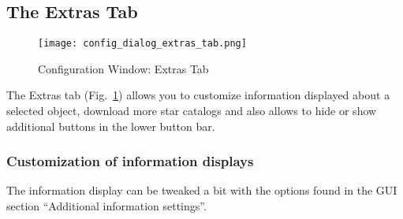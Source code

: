 \subsection{The Extras Tab}
\label{sec:gui:configuration:extras}

\begin{figure}[htbp]
\centering\texttt{[image: config\_dialog\_extras\_tab.png]}
\caption{Configuration Window: Extras Tab}
\label{fig:gui:configuration:extras}
\end{figure}

The Extras tab (Fig.~\ref{fig:gui:configuration:extras}) allows you to
customize information displayed about a selected object, download more
star catalogs and also allows to hide or show additional buttons in
the lower button bar. 
\subsubsection{Customization of information displays}
The information display can be tweaked a bit with the options found in the GUI section ``Additional information settings''.

